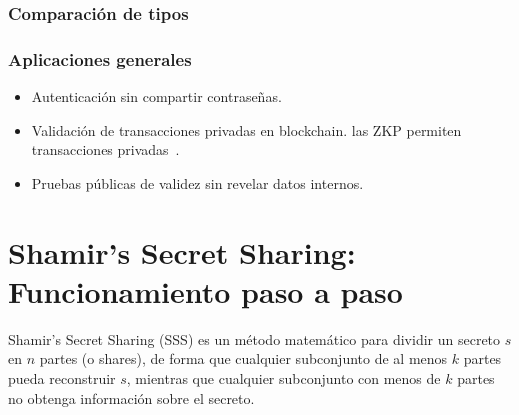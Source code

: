 \documentclass{article}
\begin{document}
\subsubsection{Comparación de tipos}

\begin{table}[h]
\centering
{}
\end{table}


\subsubsection{Aplicaciones generales}

\begin{itemize}
    \item Autenticación sin compartir contraseñas.
    \item Validación de transacciones privadas en blockchain. las ZKP permiten transacciones privadas~\cite{chainalysis2024}.
    \item Pruebas públicas de validez sin revelar datos internos.
\end{itemize}


\section{Shamir’s Secret Sharing: Funcionamiento paso a paso}

Shamir’s Secret Sharing (SSS) es un método matemático para dividir un secreto \( s \) en \( n \) partes (o shares), de forma que cualquier subconjunto de al menos \( k \) partes pueda reconstruir \( s \), mientras que cualquier subconjunto con menos de \( k \) partes no obtenga información sobre el secreto.
\end{document}

